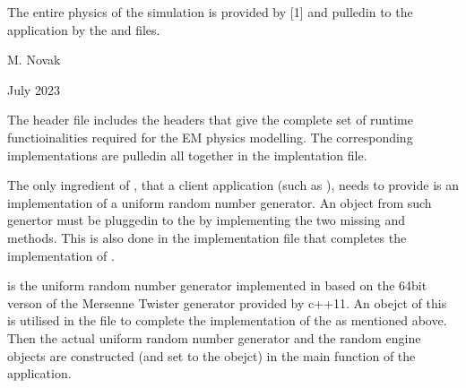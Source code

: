 \documentclass[letterpaper,10pt,english]{sphinxmanual}
\begin{document}
\begin{fulllineitems}
\label{\detokenize{Simulation/SimulationCodeDoc:_CPPv47Physics}}
\pysigstartsignatures
\pysigstartmultiline
{}
\pysigstopmultiline
\pysigstopsignatures
\sphinxAtStartPar
The entire physics of the simulation is provided by  {[}1{]} and pulled\sphinxhyphen{}in to the  application by the  and  files. 

\sphinxAtStartPar
\begin{description}
\sphinxAtStartPar
M. Novak 

\sphinxAtStartPar
July 2023

\end{description}


\sphinxAtStartPar
The  header file includes the  headers that give the complete set of run\sphinxhyphen{}time functioinalities required for the EM physics modelling. The corresponding implementations are pulled\sphinxhyphen{}in all together in the implentation file.

\sphinxAtStartPar
The only ingredient of , that a client application (such as ), needs to provide is an implementation of a uniform random number generator. An object from such genertor must be plugged\sphinxhyphen{}in to the  by implementing the two missing  and  methods. This is also done in the  implementation file that completes the implementation of .

\sphinxAtStartPar
{} is the uniform random number generator implemented in  based on the 64\sphinxhyphen{}bit verson of the Mersenne Twister generator provided by c++11. An obejct of this is utilised in the  file to complete the implementation of the  as mentioned above. Then the actual uniform random number generator and the random engine objects are constructed (and set to the  obejct) in the  main function of the application.


\end{fulllineitems}
\end{document}

